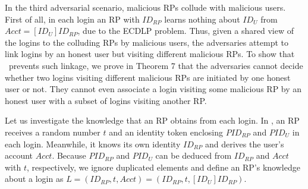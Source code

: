 



\vspace{2mm}

In the third adversarial scenario, malicious RPs collude with malicious users.
First of all,
    in each login an RP with $ID_{RP}$ learns nothing about $ID_U$ from $Acct = [ID_U]ID_{RP}$, due to the ECDLP problem.
Thus,
given a shared view of the logins to the colluding RPs by malicious users,
    the adversaries attempt to link logins by an honest user but visiting different malicious RPs.
To show that \usso\ prevents such linkage, we prove in Theorem 7 that the adversaries cannot decide whether two logins visiting different malicious RPs are initiated by one honest user or not. %
They cannot even associate a login visiting some malicious RP by an honest user with a subset of logins visiting another RP.

Let us investigate the knowledge that an RP obtains from each login. In \usso, an RP receives a random number $t$ and an identity token enclosing $PID_{RP}$ and $PID_U$ in each login. Meanwhile, it knows its own identity $ID_{RP}$ and derives the user's account $Acct$.
Because $PID_{RP}$ and $PID_U$ can be deduced from $ID_{RP}$ and $Acct$ with $t$, respectively, we ignore duplicated elements and define an RP's knowledge about a login as $L =(ID_{RP}, t, Acct)=(ID_{RP}, t, [ID_{U}]ID_{RP})$.


